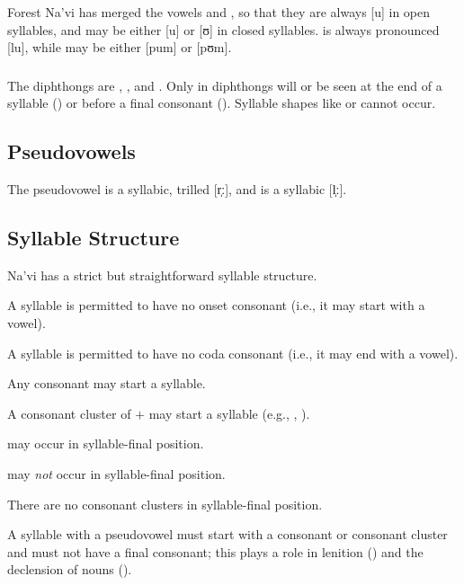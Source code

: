 \subsubsection{} Forest Na'vi has merged the vowels  and ,
so that they are always [u] in open syllables, and may be either [u]
or [ʊ] in closed syllables.   is always pronounced [lu],
while  may be either [pum] or [pʊm].


\subsubsection{} The diphthongs are , ,  and .
Only in diphthongs will  or  be seen at the end of a
syllable () or before a final consonant ().  Syllable
shapes like  or  cannot occur.

\subsection{Pseudovowels} The pseudovowel  is a syllabic,
trilled [r̩ː], and  is a syllabic [l̩ː].

\subsection{Syllable Structure}
 Na'vi has a strict but straightforward syllable structure.

\begin{itemize*}
  \item A syllable is permitted to have no onset consonant (i.e., it
    may start with a vowel).
  \item A syllable is permitted to have no coda consonant (i.e., it
    may end with a vowel).
  \item Any consonant may start a syllable.
  \item A consonant cluster of  $+$  may start a syllable (e.g., , ).
  \item {} may occur in syllable-final position.
  \item {} may \textit{not} occur in syllable-final position.
  \item There are no consonant clusters in syllable-final position.
  \item \label{l-and-s:pseudo-no-null} A syllable with a pseudovowel
    must start with a consonant or consonant cluster and must not have
    a final consonant; this plays a role in lenition
    () and the declension of nouns
    ().
\end{itemize*}

